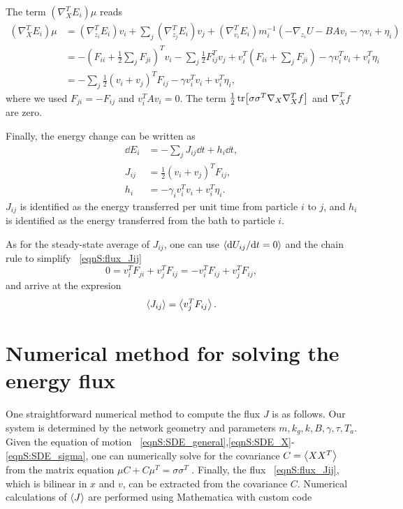 \documentclass[
 amsmath,amssymb,
 aps,
 pre,
 longbibliography,
 10pt, onecolumn,
 notitlepage
]{revtex4-1}
\begin{document}
The term $(\nabla_X^TE_i)\mu$ reads
\begin{equation}
\begin{split}
(\nabla_X^TE_i)\mu
&= (\nabla_{z_i}^TE_i)v_i + \sum_j(\nabla_{z_j}^TE_i)v_j + (\nabla_{v_i}^TE_i)m_i^{-1}(-\nabla_{z_i}U - BAv_i - \gamma v_i + \eta_i) \\
&= -(F_{ii} + \frac{1}{2}\sum_jF_{ji})^T v_i - \sum_j\frac{1}{2}F_{ij}^T v_j + v_i^T (F_{ii} + \sum_jF_{ji}) - \gamma v_i^Tv_i + v_i^T\eta_i \\
&= -\sum_j\frac{1}{2}(v_i + v_j)^T F_{ij} - \gamma v_i^Tv_i + v_i^T\eta_i ,
\end{split}
\end{equation}
where we used $F_{ji} = -F_{ij}$ and $v_i^TAv_i = 0$.
The term $\frac{1}{2}\tr[\sigma \sigma^T \nabla_X\nabla_X^Tf]$ and $\nabla_X^Tf$ are zero.

Finally, the energy change can be written as
\begin{align}
\dd E_i &= -\sum_jJ_{ij}\dd t + h_i \dd t, \label{eqnS:flux_dEi} \\
J_{ij} &= \frac{1}{2}(v_i + v_j)^T F_{ij}, \label{eqnS:flux_Jij} \\
h_i &= -\gamma_i v_i^Tv_i +v_i^T\eta_i. \label{eqnS:flux_hi}
\end{align}
$J_{ij}$ is identified as the energy transferred per unit time from particle $i$ to $j$, and $h_i$ is identified as the energy transferred from the bath to particle $i$.

As for the steady-state average of $J_{ij}$, one can use $\expval{\dd U_{ij} / \dd t =0}$ and the chain rule to simplify \eqnname~\eqref{eqnS:flux_Jij}
\begin{equation}
    0 = v_i^T F_{ji} + v_j^T F_{ij}
    = -v_i^T F_{ij} + v_j^T F_{ij},
\end{equation}
and arrive at the expresion
\begin{equation}
    \expval{J_{ij}} = \expval{v_j^T F_{ij}}.
\end{equation}


\section{Numerical method for solving the energy flux}
One straightforward numerical method to compute the flux $J$ is as follows.
Our system is determined by the network geometry and parameters $m, k_g, k, B, \gamma, \tau, T_a$.
Given the equation of motion \eqnname~\eqref{eqnS:SDE_general},\eqref{eqnS:SDE_X}-\eqref{eqnS:SDE_sigma}, one can numerically solve for the covariance $C=\expval{XX^T}$ from the matrix equation $\mu C + C \mu^T = \sigma\sigma^T$ \cite{Gardiner2009ItoCalculus,Ceriotti2010ColoredNoiseThermostats}.
Finally, the flux \eqnname~\eqref{eqnS:flux_Jij}, which is bilinear in $x$ and $v$, can be extracted from the covariance $C$.
Numerical calculations of $\expval{J}$ are performed using Mathematica with custom code \cite{WolframResearch2018MathematicaVersion}
\end{document}
